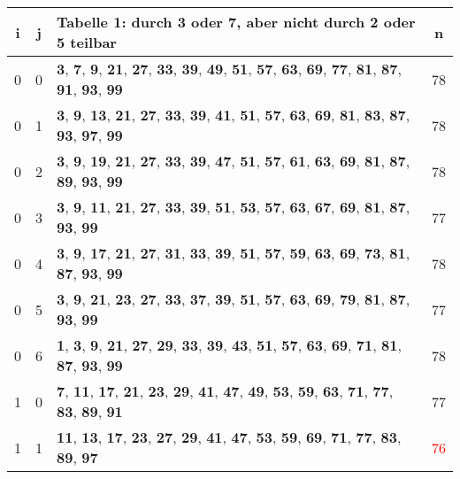 \documentclass{article}
\begin{document}
\begin{tabular}{||c|c|l|c||}
	i&j&Tabelle 1: durch 3 oder 7, aber nicht durch 2 oder 5 teilbar&n\\
	\hline
	0&0&\textbf{3}, \textbf{7}, \textbf{9}, \textbf{21}, \textbf{27}, \textbf{33}, \textbf{39}, \textbf{49}, \textbf{51}, \textbf{57}, \textbf{63}, \textbf{69}, \textbf{77}, \textbf{81}, \textbf{87}, \textbf{91}, \textbf{93}, \textbf{99}&78\\
	0&1&\textbf{3}, \textbf{9}, \textbf{13}, \textbf{21}, \textbf{27}, \textbf{33}, \textbf{39}, \textbf{41}, \textbf{51}, \textbf{57}, \textbf{63}, \textbf{69}, \textbf{81}, \textbf{83}, \textbf{87}, \textbf{93}, \textbf{97}, \textbf{99}&78\\
	0&2&\textbf{3}, \textbf{9}, \textbf{19}, \textbf{21}, \textbf{27}, \textbf{33}, \textbf{39}, \textbf{47}, \textbf{51}, \textbf{57}, \textbf{61}, \textbf{63}, \textbf{69}, \textbf{81}, \textbf{87}, \textbf{89}, \textbf{93}, \textbf{99}&78\\
	0&3&\textbf{3}, \textbf{9}, \textbf{11}, \textbf{21}, \textbf{27}, \textbf{33}, \textbf{39}, \textbf{51}, \textbf{53}, \textbf{57}, \textbf{63}, \textbf{67}, \textbf{69}, \textbf{81}, \textbf{87}, \textbf{93}, \textbf{99}&77\\
	0&4&\textbf{3}, \textbf{9}, \textbf{17}, \textbf{21}, \textbf{27}, \textbf{31}, \textbf{33}, \textbf{39}, \textbf{51}, \textbf{57}, \textbf{59}, \textbf{63}, \textbf{69}, \textbf{73}, \textbf{81}, \textbf{87}, \textbf{93}, \textbf{99}&78\\
	0&5&\textbf{3}, \textbf{9}, \textbf{21}, \textbf{23}, \textbf{27}, \textbf{33}, \textbf{37}, \textbf{39}, \textbf{51}, \textbf{57}, \textbf{63}, \textbf{69}, \textbf{79}, \textbf{81}, \textbf{87}, \textbf{93}, \textbf{99}&77\\
	0&6&\textbf{1}, \textbf{3}, \textbf{9}, \textbf{21}, \textbf{27}, \textbf{29}, \textbf{33}, \textbf{39}, \textbf{43}, \textbf{51}, \textbf{57}, \textbf{63}, \textbf{69}, \textbf{71}, \textbf{81}, \textbf{87}, \textbf{93}, \textbf{99}&78\\
	1&0&\textbf{7}, \textbf{11}, \textbf{17}, \textbf{21}, \textbf{23}, \textbf{29}, \textbf{41}, \textbf{47}, \textbf{49}, \textbf{53}, \textbf{59}, \textbf{63}, \textbf{71}, \textbf{77}, \textbf{83}, \textbf{89}, \textbf{91}&77\\
	1&1&\textbf{11}, \textbf{13}, \textbf{17}, \textbf{23}, \textbf{27}, \textbf{29}, \textbf{41}, \textbf{47}, \textbf{53}, \textbf{59}, \textbf{69}, \textbf{71}, \textbf{77}, \textbf{83}, \textbf{89}, \textbf{97}&\textcolor{red}{76}\\

\end{tabular}
\end{document}
